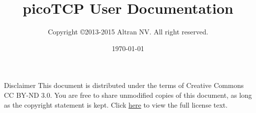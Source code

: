%






\usepackage{longtable}


\usepackage[compact]{titlesec}

\usepackage{enumitem}

\usepackage{hyperref}
\setcounter{tocdepth}{1}




\title{picoTCP User Documentation}
\author{Copyright \copyright 2013-2015 Altran NV. All right reserved.}
\maketitle
\date{\today}
\maketitle

\thispagestyle{empty}

Disclaimer
This document is distributed under the terms of Creative Commons CC BY-ND 3.0.
You are free to share unmodified copies of this document, as long as the copyright
statement is kept. Click \href{http://creativecommons.org/licenses/by-nd/3.0/} {here} to view the full license text.


